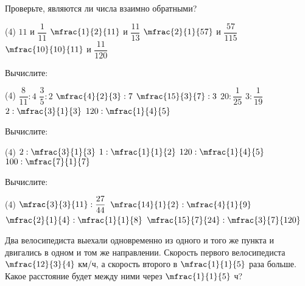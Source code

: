 \begin{homework}[number=1]
	\begin{listofex}
		\item Проверьте, являются ли числа взаимно обратными?
		\begin{tasks}(4)
			\task \( 11 \) и \( \dfrac{1}{11} \)
			\task \( \mfrac{1}{2}{11} \) и \( \dfrac{11}{13} \)
			\task \( \mfrac{2}{1}{57} \) и \( \dfrac{57}{115} \)
			\task \( \mfrac{10}{10}{11} \) и \( \dfrac{11}{120} \)
		\end{tasks}
		\item Вычислите:
		\begin{tasks}(4)
			\task \( \dfrac{8}{11}:4 \)
			\task \( \dfrac{3}{5}:2 \)
			\task \( \mfrac{4}{2}{3}:7 \)
			\task \( \mfrac{15}{3}{7}:3 \)
			\task \( 20:\dfrac{1}{25} \)
			\task \( 3:\dfrac{1}{19} \)
			\task \( 2:\mfrac{3}{1}{3} \)
			\task \( 120:\mfrac{1}{4}{5} \)
		\end{tasks}
		\item Вычислите:
		\begin{tasks}(4)
			\task \( 2:\mfrac{3}{1}{3} \)
			\task \( 1:\mfrac{1}{1}{2} \)
			\task \( 120:\mfrac{1}{4}{5} \)
			\task \( 100:\mfrac{7}{1}{7} \)
		\end{tasks}
		\item Вычислите:
		\begin{tasks}(4)
			\task \( \mfrac{3}{3}{11}:\dfrac{27}{44} \)
			\task \( \mfrac{14}{1}{2}:\mfrac{4}{1}{9} \)
			\task \( \mfrac{2}{1}{4}:\mfrac{1}{1}{8} \)
			\task \( \mfrac{15}{7}{24}:\mfrac{3}{7}{120} \)
		\end{tasks}
		\item Два велосипедиста выехали одновременно из одного и того же пункта и двигались в одном и том же направлении. Скорость первого велосипедиста \( \mfrac{12}{3}{4} \) км/ч, а скорость второго в \( \mfrac{1}{1}{5} \) раза больше. Какое расстояние будет между ними через \( \mfrac{1}{1}{5} \) ч?
	\end{listofex}
\end{homework}
%
%
